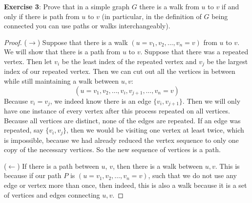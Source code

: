 \documentclass{article}
\begin{document}
\textbf{Exercise 3}: Prove that in a simple graph $G$ there is a walk from $u$ to $v$ if and only if there is path from $u$ to $v$ (in particular, in the definition of $G$ being connected you can use paths or walks interchangeably).
    \begin{proof}
        ($\rightarrow$) Suppose that there is a walk $(u = v_{1}, v_{2}, \ldots, v_{n} = v)$ from $u$ to $v$. We will show that there is a path from $u$ to $v$. Suppose that there was a repeated vertex. Then let $v_{i}$ be the least index of the repeated vertex and $v_{j}$ be the largest index of our repeated vertex. Then we can cut out all the vertices in between while still maintaining a walk between $u, v$:
            \begin{equation*}
                (u = v_{1}, v_{2}, \ldots, v_{i}, v_{j + 1}, \ldots, v_{n} = v)
            \end{equation*}
        Because $v_{i} = v_{j}$, we indeed know there is an edge $\{v_{i}, v_{j + 1}\}$. Then we will only have one instance of every vertex after this process repeated on all vertices. Because all vertices are distinct, none of the edges are repeated. If an edge was repeated, say $\{v_{i}, v_{j}\}$, then we would be visiting one vertex at least twice, which is impossible, because we had already reduced the vertex sequence to only one copy of the necessary vertices. So the new sequence of vertices is a path.

        ($\leftarrow$) If there is a path between $u$, $v$, then there is a walk between $u, v$. This is because if our path $P$ is $(u = v_{1}, v_{2}, \ldots, v_{n} = v)$, such that we do not use any edge or vertex more than once, then indeed, this is also a walk because it is a set of vertices and edges connecting $u, v$.
    \end{proof}
\end{document}
